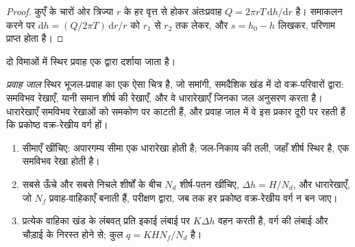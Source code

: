 \begin{proof}
कुएँ के चारों ओर त्रिज्या $r$ के हर वृत्त से होकर अंतःप्रवाह $Q = 2\pi r
T\,\mathrm dh/\mathrm dr$ है। समाकलन करने पर $\mathrm dh = (Q/2\pi T)\,\mathrm
dr/r$ को $r_1$ से $r_2$ तक लेकर, और $s = h_0 - h$ लिखकर, परिणाम प्राप्त होता है।
\end{proof}

दो विमाओं में स्थिर प्रवाह एक  द्वारा दर्शाया जाता है।

\begin{definition}[प्रवाह जाल]\label{def:b3:hydrogeology:flow-net}
\emph{प्रवाह जाल} स्थिर भूजल-प्रवाह का एक ऐसा चित्र है, जो
समांगी, समदैशिक खंड में दो वक्र-परिवारों द्वारा: समविभव रेखाएँ,
यानी समान शीर्ष की रेखाएँ, और वे धारारेखाएँ जिनका जल अनुसरण करता है।
धारारेखाएँ समविभव रेखाओं को समकोण पर काटती हैं, और प्रवाह जाल में
वे इस प्रकार दूरी पर रहती हैं कि प्रकोष्ठ वक्र-रेखीय वर्ग हों।
\end{definition}

\begin{method}[प्रवाह जाल से रिसाव]\label{met:b3:hydrogeology:flow-net}
\leavevmode
\begin{enumerate}
\item सीमाएँ खींचिए: अपारगम्य सीमा एक धारारेखा होती है; जल-निकाय की
  तली, जहाँ शीर्ष स्थिर है, एक समविभव रेखा होती है।
\item सबसे ऊँचे और सबसे निचले शीर्षों के बीच $N_d$ शीर्ष-पतन खींचिए, $\Delta h
  = H/N_d$, और धारारेखाएँ, जो $N_f$ प्रवाह-वाहिकाएँ बनाती हैं, परीक्षण द्वारा,
  जब तक हर प्रकोष्ठ वक्र-रेखीय वर्ग न बन जाए।
\item प्रत्येक वाहिका खंड के लंबवत् प्रति इकाई लंबाई पर $K\Delta h$ वहन करती है,
  वर्ग की लंबाई और चौड़ाई के निरस्त होने से; कुल $q =
  KHN_f/N_d$ है।
\end{enumerate}
\end{method}

